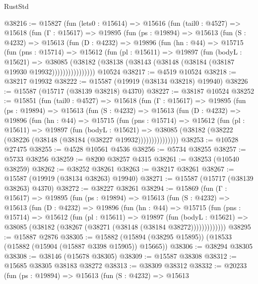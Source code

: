 \begin{lexlean}{RustStd}
\begin{coremodule}
@38216 := @15827
    (fun (lets0 : @15614) =>
    @15616
      (fun (tail0 : @4527) =>
      @15618
        (fun (Γ : @15617) =>
        @19895
          (fun (ps : @19894) =>
          @15613
            (fun (S : @4232) =>
            @15613
              (fun (D : @4232) =>
              @19896
                (fun (hn : @44) =>
                @15715
                  (fun (pns : @15714) =>
                  @15612
                    (fun (pl : @15611) =>
                    @19897
                      (fun (bodyL : @15621) =>
                      @38085
                        (@38182
                          (@38138 (@38143 (@38148 (@38184 (@38187 @19930 @19932))))))))))))))))
    @10524
@38217 := @4519 @10524
@38218 := @38217 @19932
@38222 := @15587 (@19919 (@38134 @38218) @19940)
@38226 := @15587 (@15717 (@38139 @38218) @4370)
@38227 := @38187 @10524
@38252 := @15851
    (fun (tail0 : @4527) =>
    @15618
      (fun (Γ : @15617) =>
      @19895
        (fun (ps : @19894) =>
        @15613
          (fun (S : @4232) =>
          @15613
            (fun (D : @4232) =>
            @19896
              (fun (hn : @44) =>
              @15715
                (fun (pns : @15714) =>
                @15612
                  (fun (pl : @15611) =>
                  @19897
                    (fun (bodyL : @15621) =>
                    @38085 (@38182 (@38222 (@38226 (@38148 (@38184 (@38227 @19932)))))))))))))))
@38253 := @10528 @27475
@38255 := @4528 @10561 @4536
@38256 := @5734 @38255
@38257 := @5733 @38256
@38259 := @8200 @38257 @4315
@38261 := @38253 (@10540 @38259)
@38262 := @38252 @38261
@38263 := @38217 @38261
@38267 := @15587 (@19919 (@38134 @38263) @19940)
@38271 := @15587 (@15717 (@38139 @38263) @4370)
@38272 := @38227 @38261
@38294 := @15869
    (fun (Γ : @15617) =>
    @19895
      (fun (ps : @19894) =>
      @15613
        (fun (S : @4232) =>
        @15613
          (fun (D : @4232) =>
          @19896
            (fun (hn : @44) =>
            @15715
              (fun (pns : @15714) =>
              @15612
                (fun (pl : @15611) =>
                @19897
                  (fun (bodyL : @15621) =>
                  @38085 (@38182 (@38267 (@38271 (@38148 (@38184 @38272)))))))))))))
@38295 := @15887 @2876
@38305 := @15882 (@15894 (@38295 @15895)) (@18533 (@15882 (@15904 (@15887 @3398 @15905)) @15665))
@38306 := @38294 @38305
@38308 := @38146 (@15678 @38305)
@38309 := @15587 @38308
@38312 := @15685 @38305 @38183 @38272
@38313 := @38309 @38312
@38332 := @20233
    (fun (ps : @19894) =>
    @15613
      (fun (S : @4232) =>
      @15613

\end{coremodule}
\end{lexlean}
